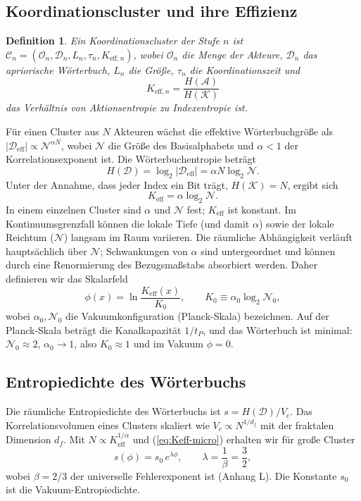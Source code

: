 \documentclass[12pt,a4paper]{article}
\newcommand{\Dir}{\mathcal{D}}
\newtheorem{definition}[theorem]{Definition}
\begin{document}
	\subsection{Koordinationscluster und ihre Effizienz}
	\begin{definition}
		Ein Koordinationscluster der Stufe \(n\) ist \(\mathcal{C}_n = (\mathcal{O}_n, \Dir_n, L_n, \tau_n, K_{\mathrm{eff},n})\), wobei \(\mathcal{O}_n\) die Menge der Akteure, \(\Dir_n\) das apriorische Wörterbuch, \(L_n\) die Größe, \(\tau_n\) die Koordinationszeit und
		\[
		K_{\mathrm{eff},n} = \frac{H(\mathcal{A})}{H(\mathcal{K})}
		\]
		das Verhältnis von Aktionsentropie zu Indexentropie ist.
	\end{definition}
	
	Für einen Cluster aus \(N\) Akteuren wächst die effektive Wörterbuchgröße als \(|\Dir_{\mathrm{eff}}| \propto \mathcal{N}^{\alpha N}\), wobei \(\mathcal{N}\) die Größe des Basisalphabets und \(\alpha<1\) der Korrelationsexponent ist. Die Wörterbuchentropie beträgt
	\[
	H(\Dir) = \log_2 |\Dir_{\mathrm{eff}}| = \alpha N \log_2 \mathcal{N}.
	\]
	Unter der Annahme, dass jeder Index ein Bit trägt, \(H(\mathcal{K}) = N\), ergibt sich
	\begin{equation}
		K_{\mathrm{eff}} = \alpha \log_2 \mathcal{N}. \label{eq:Keff-micro}
	\end{equation}
	In einem einzelnen Cluster sind \(\alpha\) und \(\mathcal{N}\) fest; \(K_{\mathrm{eff}}\) ist konstant. Im Kontinuumsgrenzfall können die lokale Tiefe (und damit \(\alpha\)) sowie der lokale Reichtum (\(\mathcal{N}\)) langsam im Raum variieren. Die räumliche Abhängigkeit verläuft hauptsächlich über \(\mathcal{N}\); Schwankungen von \(\alpha\) sind untergeordnet und können durch eine Renormierung des Bezugsmaßstabs absorbiert werden. Daher definieren wir das Skalarfeld
	\begin{equation}
		\phi(x) = \ln \frac{K_{\mathrm{eff}}(x)}{K_0}, \qquad K_0 \equiv \alpha_0 \log_2 \mathcal{N}_0,
		\label{eq:phi-def}
	\end{equation}
	wobei \(\alpha_0,\mathcal{N}_0\) die Vakuumkonfiguration (Planck-Skala) bezeichnen. Auf der Planck-Skala beträgt die Kanalkapazität \(1/t_P\), und das Wörterbuch ist minimal: \(\mathcal{N}_0 \approx 2\), \(\alpha_0 \rightarrow 1\), also \(K_0 \approx 1\) und im Vakuum \(\phi=0\).
	
	\subsection{Entropiedichte des Wörterbuchs}
	Die räumliche Entropiedichte des Wörterbuchs ist \(s = H(\Dir)/V_c\). Das Korrelationsvolumen eines Clusters skaliert wie \(V_c \propto N^{1/d_f}\) mit der fraktalen Dimension \(d_f\). Mit \(N \propto K_{\mathrm{eff}}^{1/\alpha}\) und (\ref{eq:Keff-micro}) erhalten wir für große Cluster
	\begin{equation}
		s(\phi) = s_0\, e^{\lambda\phi}, \qquad \lambda = \frac{1}{\beta} = \frac{3}{2},
		\label{eq:s-phi}
	\end{equation}
	wobei \(\beta = 2/3\) der universelle Fehlerexponent ist (Anhang L). Die Konstante \(s_0\) ist die Vakuum-Entropiedichte.
	
\end{document}
